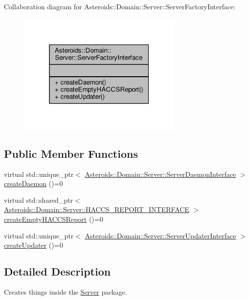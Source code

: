 Collaboration diagram for Asteroids\+:\+:Domain\+:\+:Server\+:\+:Server\+Factory\+Interface\+:\nopagebreak
\begin{figure}[H]
\begin{center}
\leavevmode
\includegraphics[width=232pt]{classAsteroids_1_1Domain_1_1Server_1_1ServerFactoryInterface__coll__graph}
\end{center}
\end{figure}
\subsection*{Public Member Functions}
\begin{DoxyCompactItemize}
\item 
virtual std\+::unique\+\_\+ptr$<$ \hyperlink{classAsteroids_1_1Domain_1_1Server_1_1ServerDaemonInterface}{Asteroids\+::\+Domain\+::\+Server\+::\+Server\+Daemon\+Interface} $>$ \hyperlink{classAsteroids_1_1Domain_1_1Server_1_1ServerFactoryInterface_acf3a4bbded1c96d2b9a2954db153c2c5}{create\+Daemon} ()=0
\item 
virtual std\+::shared\+\_\+ptr$<$ \hyperlink{classAsteroids_1_1Domain_1_1Server_1_1HACCS__REPORT__INTERFACE}{Asteroids\+::\+Domain\+::\+Server\+::\+H\+A\+C\+C\+S\+\_\+\+R\+E\+P\+O\+R\+T\+\_\+\+I\+N\+T\+E\+R\+F\+A\+CE} $>$ \hyperlink{classAsteroids_1_1Domain_1_1Server_1_1ServerFactoryInterface_a8a91d8b4b3aa1ee18a12fedf9941e98f}{create\+Empty\+H\+A\+C\+C\+S\+Report} ()=0
\item 
virtual std\+::unique\+\_\+ptr$<$ \hyperlink{classAsteroids_1_1Domain_1_1Server_1_1ServerUpdaterInterface}{Asteroids\+::\+Domain\+::\+Server\+::\+Server\+Updater\+Interface} $>$ \hyperlink{classAsteroids_1_1Domain_1_1Server_1_1ServerFactoryInterface_a08286f1ac8f12fb63eeadeedad7d6d9b}{create\+Updater} ()=0
\end{DoxyCompactItemize}


\subsection{Detailed Description}
Creates things inside the \hyperlink{namespaceAsteroids_1_1Domain_1_1Server}{Server} package. 

